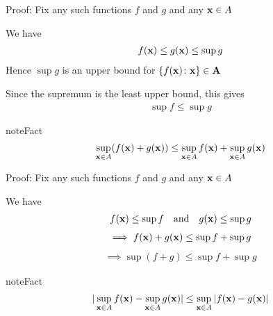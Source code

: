 \documentclass[letterpaper,10pt,english]{jupyterBook}
\begin{document}
\sphinxAtStartPar
Proof: Fix any such functions \(f\) and \(g\) and any \({\bf x} \in A\)

\sphinxAtStartPar
We have
\begin{equation*}
\begin{split}
%
f({\bf x}) \leq g({\bf x}) \leq \sup g
%
\end{split}
\end{equation*}
\sphinxAtStartPar
Hence \(\sup g\) is an upper bound for \(\{ f({\bf x}) \colon {\bf x \} \in A}\)

\sphinxAtStartPar
Since the supremum is the least upper bound, this gives
\begin{equation*}
\begin{split}
%
\sup f \leq \sup g
%
\end{split}
\end{equation*}
\begin{sphinxadmonition}{note}{Fact}
\begin{equation*}
\begin{split}
%
\sup_{{\bf x} \in A} (f({\bf x}) + g({\bf x})) 
\leq \sup_{{\bf x} \in A} f({\bf x}) + \sup_{{\bf x} \in A} g({\bf x})
%
\end{split}
\end{equation*}\end{sphinxadmonition}

\sphinxAtStartPar
Proof: Fix any such functions \(f\) and \(g\) and any \({\bf x} \in A\)

\sphinxAtStartPar
We have
\begin{equation*}
\begin{split}
%
f({\bf x}) \leq \sup f
\quad \text{and} \quad 
g({\bf x}) \leq \sup g
%
\end{split}
\end{equation*}\begin{equation*}
\begin{split}
%
\implies
f({\bf x}) + g({\bf x}) \leq \sup f + \sup g
%
\end{split}
\end{equation*}\begin{equation*}
\begin{split}
%
\implies
\sup (f + g) \leq \sup f + \sup g
%
\end{split}
\end{equation*}
\begin{sphinxadmonition}{note}{Fact}
\begin{equation*}
\begin{split}
%
| \sup_{{\bf x} \in A} f({\bf x}) - \sup_{{\bf x} \in A} g({\bf x}) | \leq
\sup_{{\bf x} \in A} |f({\bf x}) - g({\bf x})|
%
\end{split}
\end{equation*}\end{sphinxadmonition}
\end{document}

